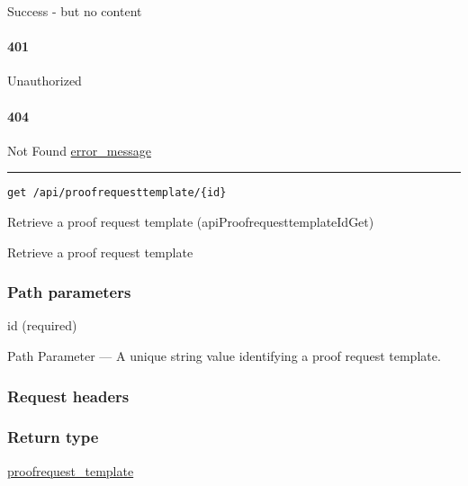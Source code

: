 Success - but no content \protect\hyperlink{}{}

\hypertarget{section-346}{%
\paragraph{401}\label{section-346}}

Unauthorized \protect\hyperlink{}{}

\hypertarget{section-347}{%
\paragraph{404}\label{section-347}}

Not Found \protect\hyperlink{error_message}{error\_message}

\begin{center}\rule{0.5\linewidth}{\linethickness}\end{center}

\protect\hypertarget{apiProofrequesttemplateIdGet}{}{}

\begin{verbatim}
get /api/proofrequesttemplate/{id}
\end{verbatim}

Retrieve a proof request template ({apiProofrequesttemplateIdGet})

Retrieve a proof request template

\hypertarget{path-parameters-54}{%
\subsubsection{Path parameters}\label{path-parameters-54}}

id (required)

{Path Parameter} --- A unique string value identifying a proof request
template.

\hypertarget{request-headers-58}{%
\subsubsection{Request headers}\label{request-headers-58}}

\hypertarget{return-type-82}{%
\subsubsection{Return type}\label{return-type-82}}

\protect\hyperlink{proofrequest_template}{proofrequest\_template}


